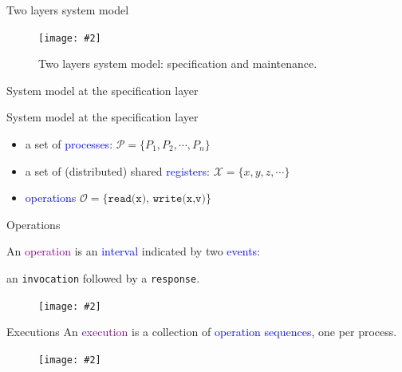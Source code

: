 \documentclass{beamer}
\newcommand{\fignocaption}[2]
{
  \begin{figure}[htp]
    \centering
      \texttt{[image: \#2]}
  \end{figure}
}
\newcommand{\fig}[3]
{
  \begin{figure}[htp]
    \centering
      \texttt{[image: \#2]}
      \caption[labelInTOC]{#3}
  \end{figure}
}
\newcommand{\largepurple}[1]{\textcolor{purple}{\large #1}}
\newcommand{\largeblue}[1]{\textcolor{blue}{\large #1}}
\newcommand{\boxedpoint}[1]{
  \begin{center}
    \fbox{\textcolor{red}{\bf #1}}
  \end{center}
}
\newcommand{\setinmath}[1]{\{ #1 \}}
\newcommand{\setfontinmath}[1]{\mathcal{#1}}
\begin{document}
\begin{frame}{Two layers system model}
  \fig{width = 0.75\textwidth}{fig/system-model-two-layers.pdf}
  {Two layers system model: specification and maintenance.}

\end{frame}
\begin{frame}{System model at the specification layer}
  \begin{block}{System model at the specification layer}
    \begin{itemize}
      \item a set of \largeblue{processes}: $\setfontinmath{P} = \setinmath{P_1,
      P_2, \cdots, P_n}$
      \item a set of (distributed) shared \largeblue{registers}:
      $\setfontinmath{X} = \setinmath{x, y, z, \cdots}$
      \item \largeblue{operations} $\setfontinmath{O} =
      \setinmath{\texttt{read(x), write(x,v)}}$
    \end{itemize}
  \end{block}

  \boxedpoint{Processes communicate via accessing the shared registers.}
\end{frame}
\begin{frame}{Operations}
  \begin{center}
    An \largepurple{operation} is an \largeblue{interval} indicated by two
    \largeblue{events}:

    an \texttt{invocation} followed by a \texttt{response}.
  \end{center}

  \fignocaption{width = 0.85\textwidth}{fig/operation.pdf}
\end{frame}
\begin{frame}{Executions}
  An \largepurple{execution} is a collection of \largeblue{operation sequences},
  one per process.

  \fignocaption{width = 0.618\textwidth}{fig/execution.pdf}


\end{frame}
\end{document}
